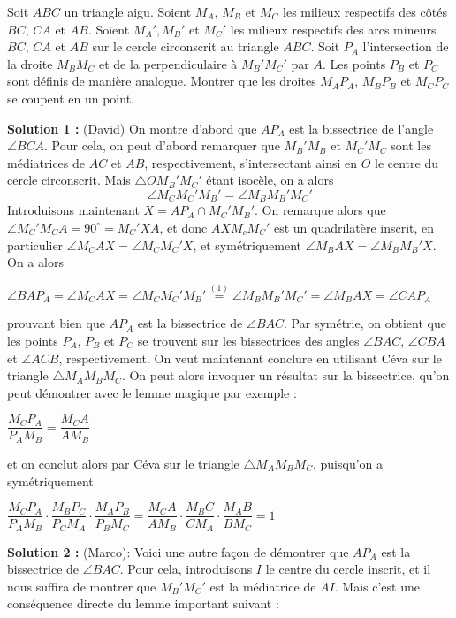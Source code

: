 Soit $ABC$ un triangle aigu. Soient $M_A$, $M_B$ et $M_C$ les milieux respectifs des côtés $BC$, $CA$ et $AB$. Soient $M_A',M_B'$ et $M_C'$ les milieux respectifs des arcs mineurs $BC$, $CA$ et $AB$ sur le cercle circonscrit au triangle $ABC$. Soit $P_A$ l'intersection de la droite $M_BM_C$ et de la perpendiculaire à $M_B'M_C'$ par $A$. Les points $P_B$ et $P_C$ sont définis de manière analogue. Montrer que les droites $M_AP_A$, $M_BP_B$ et $M_CP_C$ se coupent en un point.

\textbf{Solution 1 :} (David)
On montre d'abord que $AP_A$ est la bissectrice de l'angle $\angle BCA$. Pour cela, on peut d'abord remarquer que $M_B'M_B$ et $M_C'M_C$ sont les médiatrices de $AC$ et $AB$, respectivement, s'intersectant ainsi en $O$ le centre du cercle circonscrit. Mais $\triangle OM_B'M_C'$ étant isocèle, on a alors 
\begin{equation}
\angle M_CM_C'M_B'=\angle M_BM_B'M_C'
\end{equation}
Introduisons maintenant $X=AP_A\cap M_C' M_B'$. On remarque alors que $\angle M_C'M_CA=90^{\circ} =M_C'XA$, et donc $AXM_cM_C'$ est un quadrilatère inscrit, en particulier $\angle M_CAX=\angle M_CM_C'X$, et symétriquement $\angle M_BAX=\angle M_BM_B'X$. On a alors
\begin{center}
$\angle BAP_A=\angle M_CAX=\angle M_CM_C'M_B'\stackrel{(1)}{=}\angle M_BM_B'M_C'=\angle M_BAX=\angle CAP_A$
\end{center}
prouvant bien que $AP_A$ est la bissectrice de $\angle BAC$.
 Par symétrie, on obtient que les points $P_A$, $P_B$ et $P_C$ se trouvent sur les bissectrices des angles $\angle BAC$, $\angle CBA$ et $\angle ACB$, respectivement. On veut maintenant conclure en utilisant Céva sur le triangle $\triangle M_AM_BM_C$. On peut alors invoquer un résultat sur la bissectrice, qu'on peut démontrer avec le lemme magique par exemple :
\begin{center}
$\dfrac{M_CP_A}{P_AM_B}=\dfrac{M_CA}{AM_B}$
\end{center}
et on conclut alors par Céva sur le triangle $\triangle M_AM_BM_C$, puisqu'on a symétriquement
\begin{center}
$\dfrac{M_CP_A}{P_AM_B}\cdot\dfrac{M_BP_C}{P_CM_A}\cdot\dfrac{M_AP_B}{P_BM_C}=\dfrac{M_CA}{AM_B}\cdot\dfrac{M_BC}{CM_A}\cdot\dfrac{M_AB}{BM_C}=1$
\end{center}

\textbf{Solution 2 :} (Marco):
Voici une autre façon de démontrer que $AP_A$ est la bissectrice de $\angle BAC$. Pour cela, introduisons $I$ le centre du cercle inscrit, et il nous suffira de montrer que $M_B'M_C'$ est la médiatrice de $AI$. Mais c'est une conséquence directe du lemme important suivant :

